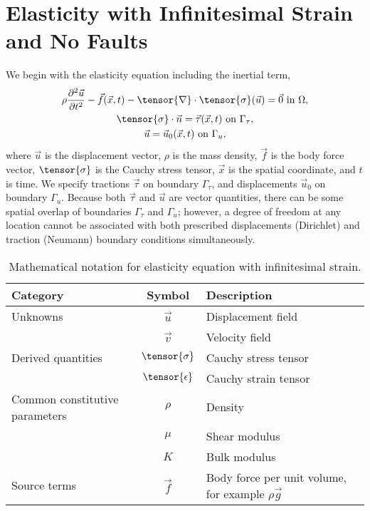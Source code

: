 \section{Elasticity with Infinitesimal Strain and No Faults}

We begin with the elasticity equation including the inertial term,
\begin{gather}
  \label{eqn:elasticity:strong:form}
  \rho \frac{\partial^2\vec{u}}{\partial t^2} - \vec{f}(\vec{x},t) - \tensor{\nabla} \cdot 
\tensor{\sigma}
(\vec{u}) = \vec{0} \text{ in }\Omega, \\
%
  \label{eqn:bc:Neumann}
  \tensor{\sigma} \cdot \vec{n} = \vec{\tau}(\vec{x},t) \text{ on }\Gamma_\tau, \\
%
  \label{eqn:bc:Dirichlet}
  \vec{u} = \vec{u}_0(\vec{x},t) \text{ on }\Gamma_u,
\end{gather}
where $\vec{u}$ is the displacement vector, $\rho$ is the mass
density, $\vec{f}$ is the body force vector, $\tensor{\sigma}$ is the
Cauchy stress tensor, $\vec{x}$ is the spatial coordinate, and $t$ is
time. We specify tractions $\vec{\tau}$ on boundary $\Gamma_\tau$, and
displacements $\vec{u}_0$ on boundary $\Gamma_u$. Because both $\vec{\tau}$
and $\vec{u}$ are vector quantities, there can be some spatial overlap
of boundaries $\Gamma_\tau$ and $\Gamma_u$; however, a degree of freedom at
any location cannot be associated with both prescribed displacements
(Dirichlet) and traction (Neumann) boundary conditions simultaneously.

\begin{table}[htbp]
  \caption{Mathematical notation for elasticity equation with
    infinitesimal strain.}
  \label{tab:notation:elasticity}
  \begin{tabular}{lcp{3in}}
    \toprule
    {\bf Category} & {\bf Symbol} & {\bf Description} \\
    \midrule
    Unknowns & $\vec{u}$ & Displacement field \\
    & $\vec{v}$ & Velocity field \\
    Derived quantities & $\tensor{\sigma}$ & Cauchy stress tensor \\
                   & $\tensor{\epsilon}$ & Cauchy strain tensor \\
    Common constitutive parameters & $\rho$ & Density \\
  & $\mu$ & Shear modulus \\
  & $K$ & Bulk modulus \\
Source terms & $\vec{f}$ & Body force per unit volume, for example $\rho \vec{g}$ \\
    \bottomrule
  \end{tabular}
\end{table}


